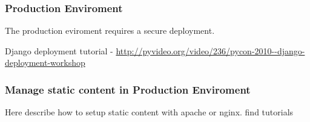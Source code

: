 \subsubsection{Production Enviroment}
The production eviroment requires a secure deployment.

Django deployment tutorial - \url{http://pyvideo.org/video/236/pycon-2010--django-deployment-workshop}


\subsubsection{Manage static content in Production Enviroment }
Here describe how to setup static content with apache or nginx. find tutorials